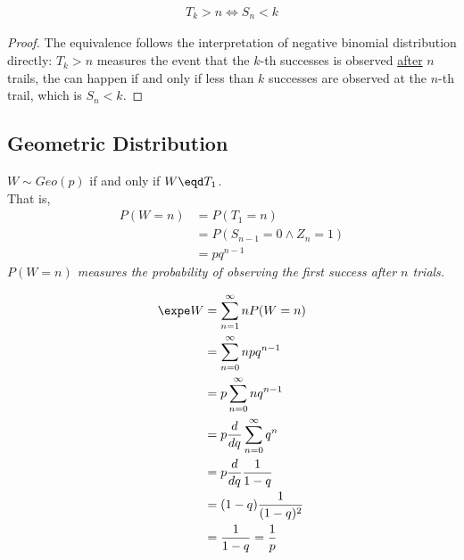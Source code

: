 \documentclass{article}
\begin{document}
   	\begin{theorem}
   		\begin{align}
   			T_k > n \iff S_n < k
   		\end{align}
   	\end{theorem}
   	
   	\begin{proof}
   		The equivalence follows the interpretation of negative binomial distribution directly: $T_k > n$ measures the event that the $k$-th successes is observed \ul{after} $n$ trails, the can happen if and only if less than $k$ successes are observed at the $n$-th trail, which is $S_n < k$.
   	\end{proof}
   	
   	\subsection{Geometric Distribution}
   	\begin{definition}
   		$W \sim Geo(p)$ if and only if $W \eqd T_1$. \\
   		That is,
   		\begin{align}
   			P(W=n) &= P(T_1=n) \\
   			&= P(S_{n-1}=0 \land Z_n = 1) \\
   			&= p q^{n-1}
   		\end{align}
   	\emph{$P(W=n)$ measures the probability of observing the first success after $n$ trials.}
   	\end{definition}
   	
   	\begin{theorem}
   		\begin{align}
   			\expe W &= \sum_{n=1}^\infty n P(W=n) \\
   			&= \sum_{n=0}^\infty n p q^{n-1} \\
   			&= p \sum_{n=0}^\infty n q^{n-1} \\
   			&= p \frac{d}{dq} \sum_{n=0}^\infty q^n \\
   			&= p \frac{d}{dq} \frac{1}{1-q} \\
   			&= (1-q) \frac{1}{(1-q)^2} \\
   			&= \frac{1}{1-q} = \frac{1}{p}
   		\end{align}
   	\end{theorem}
   	
\end{document}
